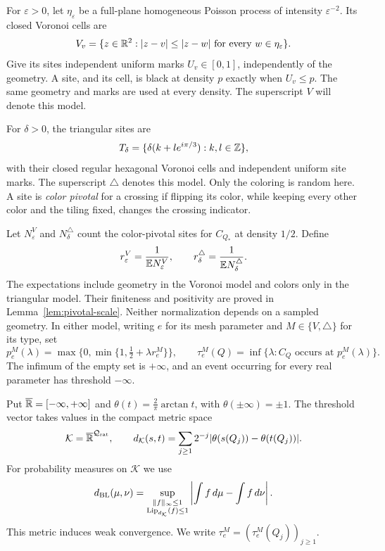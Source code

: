 For $\varepsilon>0$, let $\eta_\varepsilon$ be a full-plane homogeneous
Poisson process of intensity $\varepsilon^{-2}$. Its closed Voronoi cells
are
\[
 V_v=\{z\in\mathbb R^2:|z-v|\le |z-w|\text{ for every }w\in\eta_\varepsilon\}.
\]
Give its sites independent uniform marks $U_v\in[0,1]$, independently
of the geometry. A site, and its cell, is black at density $p$ exactly
when $U_v\le p$. The same geometry and marks are used at every density.
The superscript $V$ will denote this model.

For $\delta>0$, the triangular sites are
\[
 T_\delta=\{\delta(k+l e^{i\pi/3}):k,l\in\mathbb Z\},
\]
with their closed regular hexagonal Voronoi cells and independent
uniform site marks. The superscript $\triangle$ denotes this model.
Only the coloring is random here. A site is \emph{color pivotal} for
a crossing if flipping its color, while keeping every other color and
the tiling fixed, changes the crossing indicator.

Let $N_\varepsilon^V$ and $N_\delta^\triangle$ count the color-pivotal
sites for $C_{Q_*}$ at density $1/2$. Define
\begin{equation}
 r_\varepsilon^V=\frac1{\mathbb E N_\varepsilon^V},
 \qquad
 r_\delta^\triangle=\frac1{\mathbb E N_\delta^\triangle}.
 \label{eq:requested-scales}
\end{equation}
The expectations include geometry in the Voronoi model and colors only
in the triangular model. Their finiteness and positivity are proved in
Lemma~\ref{lem:pivotal-scale}. Neither normalization depends on a sampled
geometry. In either model, writing $e$ for its mesh parameter and
$M\in\{V,\triangle\}$ for its type, set
\begin{equation}
 p_e^M(\lambda)=\max\{0,\min\{1,\tfrac12+\lambda r_e^M\}\},
 \qquad
 \tau_e^M(Q)=\inf\{\lambda:C_Q\text{ occurs at }p_e^M(\lambda)\}.
 \label{eq:thresholds}
\end{equation}
The infimum of the empty set is $+\infty$, and an event occurring for
every real parameter has threshold $-\infty$.

Put $\overline{\mathbb R}=[-\infty,+\infty]$ and
$\theta(t)=\frac2\pi\arctan t$, with $\theta(\pm\infty)=\pm1$.
The threshold vector takes values in the compact metric space
\begin{equation}
 \mathcal K=\overline{\mathbb R}^{\mathcal Q_{\mathrm{rat}}},
 \qquad
 d_{\mathcal K}(s,t)=\sum_{j\ge1}2^{-j}
       |\theta(s(Q_j))-\theta(t(Q_j))|.
 \label{eq:threshold-space}
\end{equation}
For probability measures on $\mathcal K$ we use
\[
 d_{\mathrm{BL}}(\mu,\nu)=
 \sup_{\substack{\|f\|_\infty\le1\\\operatorname{Lip}_{d_{\mathcal K}}(f)\le1}}
 \left|\int f\,d\mu-\int f\,d\nu\right|.
\]
This metric induces weak convergence. We write
$\tau_e^M=(\tau_e^M(Q_j))_{j\ge1}$.

